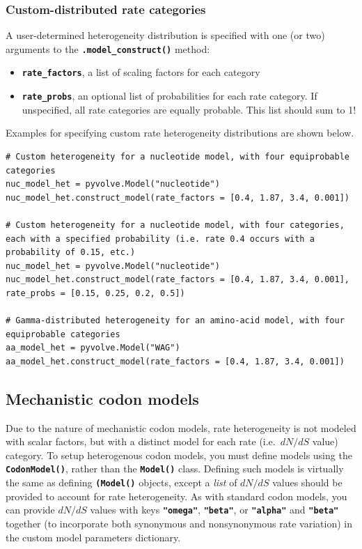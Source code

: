 \documentclass{article}
\newcommand{\code}[1]{\textbf{\texttt{\small{#1}}}}
\begin{document}
\subsubsection{Custom-distributed rate categories}

A user-determined heterogeneity distribution is specified with one (or two) arguments to the \code{.model\_construct()} method:
\begin{itemize}
	\item \code{rate\_factors}, a list of scaling factors for each category
	\item \code{rate\_probs}, an optional list of probabilities for each rate category. If unspecified, all rate categories are equally probable. This list should sum to 1!
\end{itemize}

Examples for specifying custom rate heterogeneity distributions are shown below.
\begin{lstlisting}
# Custom heterogeneity for a nucleotide model, with four equiprobable categories
nuc_model_het = pyvolve.Model("nucleotide")
nuc_model_het.construct_model(rate_factors = [0.4, 1.87, 3.4, 0.001])

# Custom heterogeneity for a nucleotide model, with four categories, each with a specified probability (i.e. rate 0.4 occurs with a probability of 0.15, etc.)
nuc_model_het = pyvolve.Model("nucleotide")
nuc_model_het.construct_model(rate_factors = [0.4, 1.87, 3.4, 0.001], rate_probs = [0.15, 0.25, 0.2, 0.5])

# Gamma-distributed heterogeneity for an amino-acid model, with four equiprobable categories
aa_model_het = pyvolve.Model("WAG")
aa_model_het.construct_model(rate_factors = [0.4, 1.87, 3.4, 0.001])
\end{lstlisting}



 
\subsection{Mechanistic codon models}

Due to the nature of mechanistic codon models, rate heterogeneity is not modeled with scalar factors, but with a distinct model for each rate (i.e.\, $dN/dS$ value) category. To setup heterogenous codon models, you must define models using the \code{CodonModel()}, rather than the \code{Model()} class. Defining such models is virtually the same as defining \code{(Model()} objects, except a \emph{list} of $dN/dS$ values should be provided to account for rate heterogeneity. As with standard codon models, you can provide $dN/dS$ values with keys \code{"omega"}, \code{"beta"}, or \code{"alpha"} and \code{"beta"} together (to incorporate both synonymous and nonsynonymous rate variation) in the custom model parameters dictionary.
\end{document}
